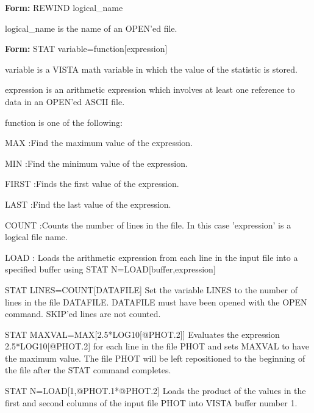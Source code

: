 {\newpage\clearpage
{}%
\begin{command}
  \item[\textbf{Form: }REWIND logical\_name\hfill]{}
  \item[logical\_name]{is the name of an OPEN'ed file.}
\end{command}%
\lthtmlfigureZ
\lthtmlcheckvsize\clearpage}

{\newpage\clearpage
{}%
\begin{command}
  \item[\textbf{Form: } STAT variable=function{[expression]}\hfill]{}
  \item[variable]{is a VISTA math variable in which the
       value of the statistic is stored.}
  \item[expression]{is an arithmetic expression which involves
       at least one reference to data in an OPEN'ed ASCII file.}
  \item[function]{is one of the following:}
  \item{MAX :Find the maximum value of the expression.}
  \item{MIN :Find the minimum value of the expression.}
  \item{FIRST :Finds the first value of the expression.}
  \item{LAST :Find the last value of the expression.}
  \item{COUNT :Counts the number of lines in the file.
        In this case 'expression' is a logical file name.}
  \item{LOAD   :  Loads the arithmetic expression from each
       line in the input file into a specified buffer
       using STAT N=LOAD{[buffer,expression]}}
\end{command}%
\lthtmlfigureZ
\lthtmlcheckvsize\clearpage}

{\newpage\clearpage
{}%
\begin{example}
  \item[STAT LINES=COUNT{[DATAFILE]}\hfill]{ Set the variable LINES to the
       number of lines in the file DATAFILE.  DATAFILE must have been
       opened with the OPEN command.  SKIP'ed lines are not counted.}
\par
\item[STAT MAXVAL=MAX{[2.5*LOG10{[@PHOT.2]}]}\hfill]{ Evaluates the
       expression 2.5*LOG10{[@PHOT.2]} for each line in the file PHOT and
       sets MAXVAL to have the maximum value.  The file PHOT will be left
       repositioned to the beginning of the file after the STAT command
       completes.}
\par
\item[STAT N=LOAD{[1,@PHOT.1*@PHOT.2]}\hfill]{ Loads the product of the
       values in the first and second columns of the input file PHOT into
       VISTA buffer number 1.}
\end{example}%
\lthtmlfigureZ
\lthtmlcheckvsize\clearpage}

